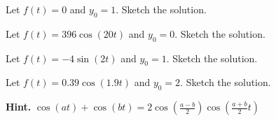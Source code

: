 	\begin{parts}
		\item Let $f(t)=0$ and $y_0=1$. Sketch the solution.
		\item Let $f(t)= 396\cos(20t)$ and $y_0=0$. Sketch the solution.

		\item Let $f(t) = -4\sin(2t)$ and $y_0=1$. Sketch the solution.

		\item Let $f(t) = 0.39\cos(1.9t)$ and $y_0=2$. Sketch the solution.
		
		\textbf{Hint. } $\displaystyle \cos(at) + \cos(bt) = 2 \cos\left( \frac{a-b}{2} \right)  \cos\left(\frac{a+b}{2} t \right)$
	\end{parts}



\standardonlynewpage
